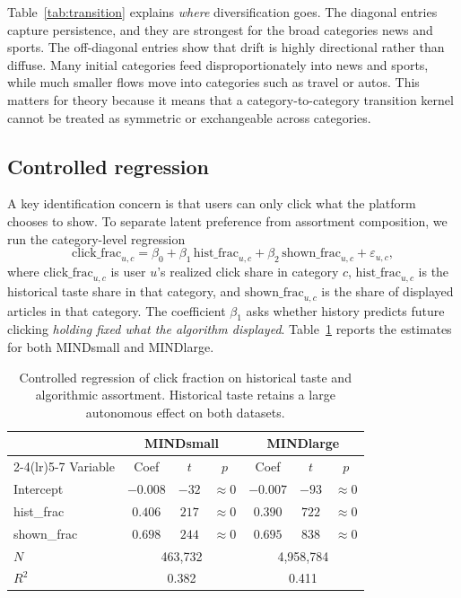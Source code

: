 \documentclass[11pt]{article}
\begin{document}
Table~\ref{tab:transition} explains \emph{where} diversification goes. The diagonal entries capture persistence, and they are strongest for the broad categories news and sports. The off-diagonal entries show that drift is highly directional rather than diffuse. Many initial categories feed disproportionately into news and sports, while much smaller flows move into categories such as travel or autos. This matters for theory because it means that a category-to-category transition kernel cannot be treated as symmetric or exchangeable across categories.
\subsection{Controlled regression}
\label{sec:regression}

A key identification concern is that users can only click what the platform chooses to show. To separate latent preference from assortment composition, we run the category-level regression
\[
\text{click\_frac}_{u,c}
=
\beta_0
+
\beta_1\,\text{hist\_frac}_{u,c}
+
\beta_2\,\text{shown\_frac}_{u,c}
+
\varepsilon_{u,c},
\]
where $\text{click\_frac}_{u,c}$ is user $u$'s realized click share in category $c$, $\text{hist\_frac}_{u,c}$ is the historical taste share in that category, and $\text{shown\_frac}_{u,c}$ is the share of displayed articles in that category. The coefficient $\beta_1$ asks whether history predicts future clicking \emph{holding fixed what the algorithm displayed}. Table~\ref{tab:controlled_reg} reports the estimates for both MINDsmall and MINDlarge.

\begin{table}[ht]
\centering
\caption{Controlled regression of click fraction on historical taste and algorithmic assortment. Historical taste retains a large autonomous effect on both datasets.}
\label{tab:controlled_reg}
\begin{tabular}{lcccccc}
\toprule
 & \multicolumn{3}{c}{MINDsmall} & \multicolumn{3}{c}{MINDlarge} \\
\cmidrule(lr){2-4}\cmidrule(lr){5-7}
Variable & Coef & $t$ & $p$ & Coef & $t$ & $p$ \\
\midrule
Intercept & $-0.008$ & $-32$ & $\approx 0$ & $-0.007$ & $-93$ & $\approx 0$ \\
hist\_frac & $0.406$ & $217$ & $\approx 0$ & $0.390$ & $722$ & $\approx 0$ \\
shown\_frac & $0.698$ & $244$ & $\approx 0$ & $0.695$ & $838$ & $\approx 0$ \\
\midrule
$N$ & \multicolumn{3}{c}{463,732} & \multicolumn{3}{c}{4,958,784} \\
$R^2$ & \multicolumn{3}{c}{0.382} & \multicolumn{3}{c}{0.411} \\
\bottomrule
\end{tabular}
\end{table}
\FloatBarrier
\end{document}
